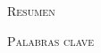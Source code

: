 \begin{spanish}
{\scshape\Large Resumen\par}
\vspace{0.5cm}

\vspace{1cm}

{\scshape\Large Palabras clave\par}
\vspace{0.5cm}
\end{spanish}

\afterpage{\blankpage}
\cleardoublepage
